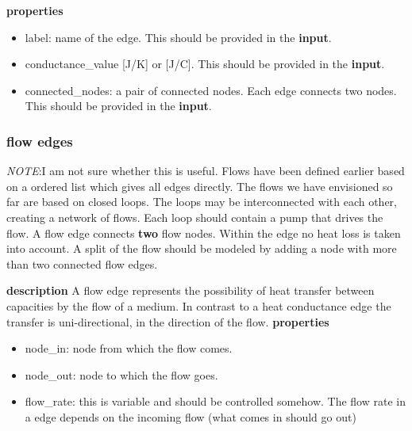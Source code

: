 \textbf{properties}
\begin{itemize}
	\item label: name of the edge. This should be provided in the \textbf{input}.
	\item conductance\_value [J/K] or [J/\degree C]. This should be provided in the \textbf{input}.
	\item connected\_nodes: a pair of connected nodes. Each edge connects two nodes. This should be provided in the \textbf{input}. 
\end{itemize}


\subsubsection{flow edges}
\emph{NOTE}:I am not sure whether this is useful. Flows have been defined earlier based on a ordered list which gives all edges directly. The flows we have envisioned so far are based on closed loops. The loops may be interconnected with each other, creating a network of flows. Each loop should contain a pump that drives the flow. A flow edge connects \textbf{two} flow nodes. Within the edge no heat loss is taken into account. A split of the flow should be modeled by adding a node with more than two connected flow edges. 

\textbf{description} A flow edge represents the possibility of heat transfer between capacities by the flow of a medium. In contrast to a heat conductance edge the transfer is uni-directional, in the direction of the flow. 
\textbf{properties}
\begin{itemize}	
	\item node\_in: node from which the flow comes. 
	\item node\_out: node to which the flow goes. 	
	\item flow\_rate: this is variable and should be controlled somehow. The flow rate in a edge depends on the incoming flow (what comes in should go out) 
\end{itemize}


